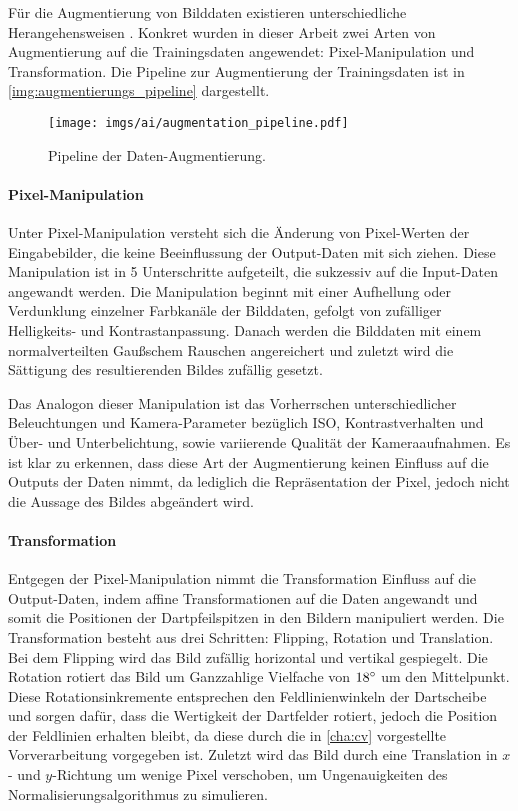 Für die Augmentierung von Bilddaten existieren unterschiedliche Herangehensweisen \cite{augmentierung_techniken}. Konkret wurden in dieser Arbeit zwei Arten von Augmentierung auf die Trainingsdaten angewendet: Pixel-Manipulation und Transformation. Die Pipeline zur Augmentierung der Trainingsdaten ist in \autoref{img:augmentierungs_pipeline} dargestellt.

\begin{figure}
    \centering
    \texttt{[image: imgs/ai/augmentation\_pipeline.pdf]}
    \caption{Pipeline der Daten-Augmentierung.}
    \label{img:augmentierungs_pipeline}
\end{figure}

\paragraph{Pixel-Manipulation}

Unter Pixel-Manipulation versteht sich die Änderung von Pixel-Werten der Eingabebilder, die keine Beeinflussung der Output-Daten mit sich ziehen. Diese Manipulation ist in 5 Unterschritte aufgeteilt, die sukzessiv auf die Input-Daten angewandt werden. Die Manipulation beginnt mit einer Aufhellung oder Verdunklung einzelner Farbkanäle der Bilddaten, gefolgt von zufälliger Helligkeits- und Kontrastanpassung. Danach werden die Bilddaten mit einem normalverteilten Gaußschem Rauschen angereichert und zuletzt wird die Sättigung des resultierenden Bildes zufällig gesetzt.

Das Analogon dieser Manipulation ist das Vorherrschen unterschiedlicher Beleuchtungen und Kamera-Parameter bezüglich ISO, Kontrastverhalten und Über- und Unterbelichtung, sowie variierende Qualität der Kameraaufnahmen. Es ist klar zu erkennen, dass diese Art der Augmentierung keinen Einfluss auf die Outputs der Daten nimmt, da lediglich die Repräsentation der Pixel, jedoch nicht die Aussage des Bildes abgeändert wird.

\paragraph{Transformation}

Entgegen der Pixel-Manipulation nimmt die Transformation Einfluss auf die Output-Daten, indem affine Transformationen auf die Daten angewandt und somit die Positionen der Dartpfeilspitzen in den Bildern manipuliert werden. Die Transformation besteht aus drei Schritten: Flipping, Rotation und Translation. Bei dem Flipping wird das Bild zufällig horizontal und vertikal gespiegelt. Die Rotation rotiert das Bild um Ganzzahlige Vielfache von $18^{\circ}$ um den Mittelpunkt. Diese Rotationsinkremente entsprechen den Feldlinienwinkeln der Dartscheibe und sorgen dafür, dass die Wertigkeit der Dartfelder rotiert, jedoch die Position der Feldlinien erhalten bleibt, da diese durch die in \autoref{cha:cv} vorgestellte Vorverarbeitung vorgegeben ist. Zuletzt wird das Bild durch eine Translation in $x$- und $y$-Richtung um wenige Pixel verschoben, um Ungenauigkeiten des Normalisierungsalgorithmus zu simulieren.

